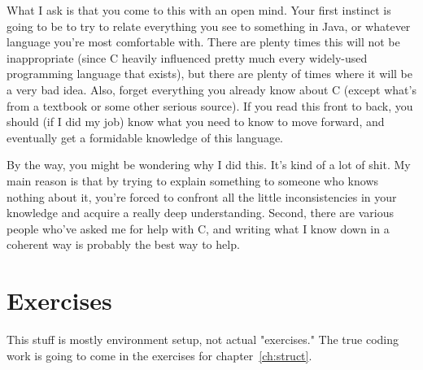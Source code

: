 \documentclass[ebook,11pt,oneside,openany]{memoir}
\begin{document}
What I ask is that you come to this with an open mind. Your first instinct is going to be to try to relate everything you see to something in Java, or whatever language you're most comfortable with. There are plenty times this will not be inappropriate (since C heavily influenced pretty much every widely-used programming language that exists), but there are plenty of times where it will be a very bad idea.  Also, forget everything you already know about C (except what's from a textbook or some other serious source). If you read this front to back, you should (if I did my job) know what you need to know to move forward, and eventually get a formidable knowledge of this language.

By the way, you might be wondering why I did this. It's kind of a lot of shit. My main reason is that by trying to explain something to someone who knows nothing about it, you're forced to confront all the little inconsistencies in your knowledge and acquire a really deep understanding. Second, there are various people who've asked me for help with C, and writing what I know down in a coherent way is probably the best way to help.

\section{Exercises}

This stuff is mostly environment setup, not actual "exercises." The true coding work is going to come in the exercises for chapter~\ref{ch:struct}.
\end{document}
